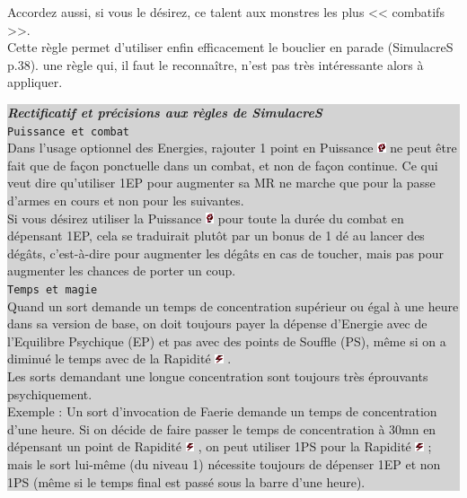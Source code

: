 \documentclass[11pt,twoside,a4paper]{article}
\def\imgPUISS{\includegraphics[width=0.25cm]{../../../../../imgGraphics/rolePlayingGame/SimulacreS/mini12x12/puissance.png} }
\def\imgRAPID{\includegraphics[width=0.25cm]{../../../../../imgGraphics/rolePlayingGame/SimulacreS/mini12x12/rapidite.png} }
\begin{document}
\begin{multicols*}{3}
{Accordez aussi, si vous le d{\'e}sirez, ce talent aux monstres les plus << combatifs >>.~\\

Cette r{\`e}gle permet d'utiliser enfin efficacement le bouclier en parade (SimulacreS p.38). une r{\`e}gle qui, il faut le reconna{\^i}tre, n'est pas tr{\`e}s int{\'e}ressante alors {\`a} appliquer.~\\


\colorbox{lightgrey}{ %
\begin{minipage}[ht]{0.30\textwidth}
\textbf{\textit{Rectificatif et pr{\'e}cisions aux r{\`e}gles de SimulacreS}}~\\

\texttt{Puissance et combat}~\\

Dans l'usage optionnel des Energies, rajouter 1 point en Puissance \imgPUISS ne peut {\^e}tre fait que de fa\c{c}on ponctuelle dans un combat, et non de fa\c{c}on continue. Ce qui veut dire qu'utiliser 1EP pour augmenter sa MR ne marche que pour la passe d'armes en cours et non pour les suivantes.~\\

Si vous d{\'e}sirez utiliser la Puissance \imgPUISS pour toute la dur{\'e}e du combat en d{\'e}pensant 1EP, cela se traduirait plut{\^o}t par un bonus de 1 d{\'e} au lancer des d{\'e}g{\^a}ts, c'est-{\`a}-dire pour augmenter les d{\'e}g{\^a}ts en cas de toucher, mais pas pour augmenter les chances de porter un coup.~\\

\texttt{Temps et magie}~\\

Quand un sort demande un temps de concentration sup{\'e}rieur ou {\'e}gal {\`a} une heure dans sa version de base, on doit toujours payer la d{\'e}pense d'Energie avec de l'Equilibre Psychique (EP) et pas avec des points de Souffle (PS), m{\^e}me si on a diminu{\'e} le temps avec de la Rapidit{\'e} \imgRAPID.~\\

Les sorts demandant une longue concentration sont toujours tr{\`e}s {\'e}prouvants psychiquement.~\\ 

Exemple : Un sort d'invocation de Faerie demande un temps de concentration d'une heure. Si on d{\'e}cide de faire passer le temps de concentration {\`a} 30mn en d{\'e}pensant un point de Rapidit{\'e} \imgRAPID, on peut utiliser 1PS pour la Rapidit{\'e} \imgRAPID ; mais le sort lui-m{\^e}me (du niveau 1) n{\'e}cessite toujours de d{\'e}penser 1EP et non 1PS (m{\^e}me si le temps final est pass{\'e} sous la barre d'une heure).~\\


\end{minipage}}}
\end{multicols*}
\end{document}
